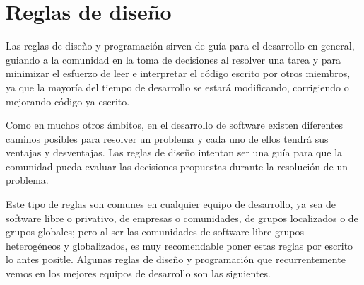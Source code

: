 \section{Reglas de diseño}

Las reglas de diseño y programación sirven de guía para el desarrollo en general, guiando a la comunidad en la toma de decisiones al resolver una tarea y para minimizar el esfuerzo de leer e interpretar el código escrito por otros miembros, ya que la mayoría del tiempo de desarrollo se estará modificando, corrigiendo o mejorando código ya escrito.

Como en muchos otros ámbitos, en el desarrollo de software existen diferentes caminos posibles para resolver un problema y cada uno de ellos tendrá sus ventajas y desventajas. Las reglas de diseño intentan ser una guía para que la comunidad pueda evaluar las decisiones propuestas durante la resolución de un problema.

Este tipo de reglas son comunes en cualquier equipo de desarrollo, ya sea de software libre o privativo, de empresas o comunidades, de grupos localizados o de grupos globales; pero al ser las comunidades de software libre grupos heterogéneos y globalizados, es muy recomendable poner estas reglas por escrito lo antes positle. Algunas reglas de diseño y programación que recurrentemente vemos en los mejores equipos de desarrollo son las siguientes.

